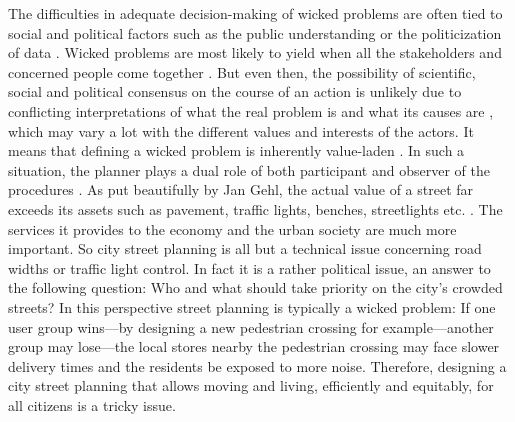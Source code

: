 \documentclass[10pt,a4paper]{article}
\begin{document}
\begin{multicols}{2}
The difficulties in adequate decision-making of wicked problems are often tied to social and political factors such as the public understanding or the politicization of data \citep{r22}. Wicked problems are most likely to yield when all the stakeholders and concerned people come together \citep{r23}. But even then, the possibility of scientific, social and political consensus on the course of an action is unlikely due to conflicting interpretations of what the real problem is and what its causes are \citep{r24}, which may vary a lot with the different values and interests of the actors. It means that defining a wicked problem is inherently value-laden \citep{r25, r26}. In such a situation, the planner plays a dual role of both participant and observer of the procedures \citep{r27}. As put beautifully by Jan Gehl, the actual value of a street far exceeds its assets such as pavement, traffic lights, benches, streetlights etc. \citep{r28}. The services it provides to the economy and the urban society are much more important. So city street planning is all but a technical issue concerning road widths or traffic light control. In fact it is a rather political issue, an answer to the following question: Who and what should take priority on the city's crowded streets? In this perspective street planning is typically a wicked problem: If one user group wins---by designing a new pedestrian crossing for example---another group may lose---the local stores nearby the pedestrian crossing may face slower delivery times and the residents be exposed to more noise. Therefore, designing a city street planning that allows moving and living, efficiently and equitably, for all citizens is a tricky issue.


\end{multicols}
\end{document}
